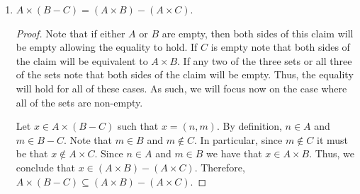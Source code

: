 \documentclass[12pt]{article}
\begin{document}
\begin{enumerate}[label=(\alph*)]
\begin{proof}
		Let $y \in (A \cap C) \times (B \cap D)$ such that $y = (n, m)$. By definition,
		$n \in A \cap C$ and $m \in B \cap D$. Since $n \in A \cap C$, it must be 
		that $n \in A$ and $n \in C$. Similarly, since $m \in B \cap D$, it must also be
		that $m \in B$ and $m \in D$. In particular, $x \in A \times B$ and 
		$x \in C \times D$ by definition. Therefore, $x \in (A \times B) \cap (C \times D)$.
		Hence, it must be that $(A \cap C) \times (B \cap D) \subseteq (A \times B)
		\cap (C \times D)$. Therefore, we conclude that $(A \times B) \cap (C \times D) = 
		(A \cap C) \cap (B \times D)$.
	\end{proof}
	\item $A \times (B - C) = (A \times B) - (A \times C)$.
	\begin{proof}
		Note that if either $A$ or $B$ are empty, then both sides of this claim will
		be empty allowing the equality to hold. If $C$ is empty note that both sides
		of the claim will be equivalent to $A \times B$. If any two of the three
		sets or all three of the sets note that both sides of the claim will be empty.
		Thus, the equality will hold for all of these cases. As such, we will focus now
		on the case where all of the sets are non-empty.
		
		Let $x \in A \times (B - C)$ such that $x = (n, m)$. By definition,
		$n \in A$ and $m \in B - C$. Note that $m \in B$ and $m \notin C$. 
		In particular, since $m \notin C$ it must be that $x \notin A \times C$.
		Since $n \in A$ and $m \in B$ we have that $x \in A \times B$. Thus, we 
		conclude that $x \in (A \times B) - (A \times C)$. Therefore, 
		$A \times (B - C) \subseteq (A \times B) - (A \times C)$.
		

\end{proof}
\end{enumerate}
\end{document}
